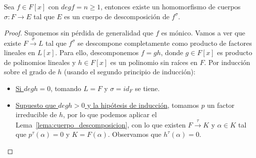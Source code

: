 \begin{prop}\label{prop:existe_cdd}
    Sea $f\in F[x]$ con $degf = n \geq 1$, entonces existe un homomorfismo de cuerpos $\sigma:F\to E$ tal que $E$ es un cuerpo de descomposición de $f^{\sigma}$.
    \begin{proof}
        Suponemos sin pérdida de generalidad que $f$ es mónico. Vamos a ver que existe $F\stackrel{\sigma}{\to}L$ tal que $f^\sigma$ se descompone completamente como producto de factores lineales en $L[x]$. Para ello, descomponemos $f=gh$, donde $g\in F[x]$ es producto de polinomios lineales y $h\in F[x]$ es un polinomio sin raíces en $F$. Por inducción sobre el grado de $h$ (usando el segundo principio de inducción):
        \begin{itemize}
            \item \underline{Si $deg h = 0$}, tomando $L = F$ y $\sigma = id_F$ se tiene.
            \item \underline{Supuesto que $degh>0$ y la hipótesis de inducción}, tomamos $p$ un factor irreducible de $h$, por lo que podemos aplicar el Lema~\ref{lema:cuerpo_descomposicion}, con lo que existen $F\stackrel{\tau}{\to}K$ y $\alpha\in K$ tal que $p^\tau(\alpha)=0$ y $K = F(\alpha)$. Observamos que $h^\tau(\alpha)=0$.


\end{itemize}
\end{proof}
\end{prop}
